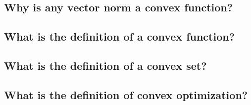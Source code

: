 \subsection{Why is any vector norm a convex function?}

\subsection{What is the definition of a convex function?}

\subsection{What is the definition of a convex set?}

\subsection{What is the definition of convex optimization?}
